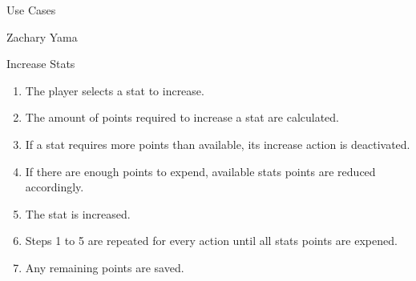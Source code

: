 \documentclass[12pt]{report}
\begin{document}
\begin{section}{Use Cases}
\begin{subsection}{Zachary Yama}
\begin{subsubsection}{Increase Stats}
\begin{enumerate}
\item The player selects a stat to increase.
\item The amount of points required to increase a stat are calculated.
\item If a stat requires more points than available, its increase action is
deactivated.
\item If there are enough points to expend, available stats points are
reduced accordingly.
\item The stat is increased. 
\item Steps 1 to 5 are repeated for every action until all stats points are
expened.
\item Any remaining points are saved.
\end{enumerate}
\end{subsubsection}
\end{subsection}
\end{section}
\end{document}
